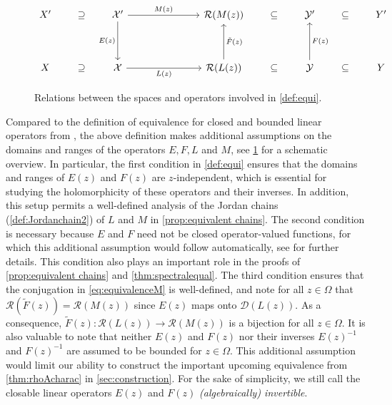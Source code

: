 \documentclass[english]{myarticle}
\begin{document}
\begin{sloppypar}
\begin{figure}[ht]
\centering
\[\begin{tikzcd}[column sep=scriptsize]
	{X'} & \supseteq & {\mathcal{X}'} &&&& {\mathcal{R}(M(z))} & \subseteq & {\mathcal{Y}'} & \subseteq & {Y'} \\
	\\
	X & \supseteq & {\mathcal{X}} &&&& {\mathcal{R}(L(z))} & \subseteq & {\mathcal{Y}} & \subseteq & Y
	\arrow["{M(z)}", from=1-3, to=1-7]
	\arrow["{E(z)}"', from=1-3, to=3-3]
	\arrow["{L(z)}"', from=3-3, to=3-7]
	\arrow["{\tilde{F}(z)}"', from=3-7, to=1-7]
	\arrow["{F(z)}"', from=3-9, to=1-9]
\end{tikzcd}\]
\caption{Relations between the spaces and operators involved in \cref{def:equi}.}
\label{fig:comm-diagram}
\end{figure}

Compared to the definition of equivalence for closed and bounded linear operators from \cite[Section I.1.2]{Kaashoek1992}, the above definition makes additional assumptions on the domains and ranges of the operators $E,F,L$ and $M$, see \cref{fig:comm-diagram} for a schematic overview. In particular, the first condition in \cref{def:equi} ensures that the domains and ranges of $E(z)$ and $F(z)$ are $z$-independent, which is essential for studying the holomorphicity of these operators and their inverses. In addition, this setup permits a well-defined analysis of the Jordan chains (\cref{def:Jordanchain2}) of $L$ and $M$ in \cref{prop:equivalent chains}. The second condition is necessary because $E$ and $F$ need not be closed operator-valued functions, for which this additional assumption would follow automatically, see \cite[Section I.2]{Gohberg1990} for further details. This condition also plays an important role in the proofs of \cref{prop:equivalent chains} and \cref{thm:spectralequal}. The third condition ensures that the conjugation in \eqref{eq:equivalenceM} is well-defined, and note for all $z \in \Omega$ that $\mathcal{R}(\tilde{F}(z)) = \mathcal{R}(M(z))$ since $E(z)$ maps onto $\mathcal{D}(L(z))$. As a consequence, $\tilde{F}(z) : \mathcal{R}(L(z)) \to \mathcal{R}(M(z))$ is a bijection for all $z \in \Omega$. It is also valuable to note that neither $E(z)$ and $F(z)$ nor their inverses $E(z)^{-1}$ and $F(z)^{-1}$ are assumed to be bounded for $z \in \Omega$. This additional assumption would limit our ability to construct the important upcoming equivalence from \cref{thm:rhoAcharac} in \cref{sec:construction}. For the sake of simplicity, we still call the closable linear operators $E(z)$ and $F(z)$ \emph{(algebraically) invertible}.


\end{sloppypar}
\end{document}

